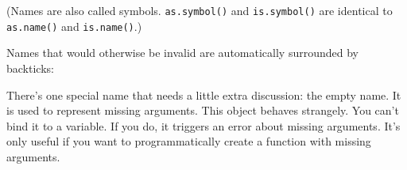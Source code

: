 \begin{Shaded}
\begin{Highlighting}[]
\NormalTok{(}\NormalTok{)}
\NormalTok{(}\NormalTok{(}\NormalTok{))}

\NormalTok{(}\NormalTok{)}
\NormalTok{(}
\NormalTok{(}\NormalTok{(}
\end{Highlighting}
\end{Shaded}

(Names are also called symbols. \texttt{as.symbol()} and
\texttt{is.symbol()} are identical to \texttt{as.name()} and
\texttt{is.name()}.)

Names that would otherwise be invalid are automatically surrounded by
backticks: \vspace*{-3pt}

\begin{Shaded}
\begin{Highlighting}[]
\NormalTok{(}\NormalTok{)}
\NormalTok{(}\NormalTok{)}
\end{Highlighting}
\end{Shaded}\vspace*{-3pt}

There's one special name that needs a little extra discussion: the empty
name. It is used to represent missing arguments. This object behaves
strangely. You can't bind it to a variable. If you do, it triggers an
error about missing arguments. It's only useful if you want to
programmatically create a function with missing arguments.\vspace*{-3pt}

\begin{Shaded}
\begin{Highlighting}[]
\StringTok{ }
\NormalTok{(}
\NormalTok{(}

\StringTok{ }
\end{Highlighting}
\end{Shaded}\vspace*{-3pt}

